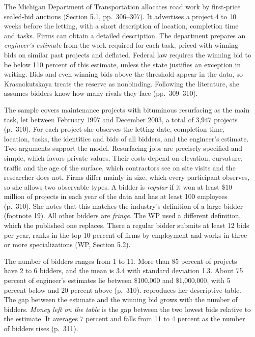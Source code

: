 The Michigan Department of Transportation allocates road work by first-price sealed-bid auctions
(Section 5.1, pp.~306--307). It advertises a project 4 to 10 weeks before the letting, with a short
description of location, completion time and tasks. Firms can obtain a detailed description. The
department prepares an \emph{engineer's estimate} from the work required for each task, priced with
winning bids on similar past projects and deflated. Federal law requires the winning bid to be below
110 percent of this estimate, unless the state justifies an exception in writing. Bids and even
winning bids above the threshold appear in the data, so Krasnokutskaya treats the reserve as
nonbinding. Following the literature, she assumes bidders know how many rivals they face
(pp.~309--310).

The sample covers maintenance projects with bituminous resurfacing as the main task, let between
February 1997 and December 2003, a total of 3,947 projects (p.~310). For each project she observes the
letting date, completion time, location, tasks, the identities and bids of all bidders, and the
engineer's estimate. Two arguments support the model. Resurfacing jobs are precisely specified and
simple, which favors private values. Their costs depend on elevation, curvature, traffic and the age
of the surface, which contractors see on site visits and the researcher does not. Firms differ mainly
in size, which every participant observes, so she allows two observable types. A bidder is
\emph{regular} if it won at least \$10 million of projects in each year of the data and has at least
100 employees (p.~310). She notes that this matches the industry's definition of a large bidder
(footnote 19). All other bidders are \emph{fringe}. The WP used a different definition, which the
published one replaces. There a regular bidder submits at least 12 bids per year, ranks in the top 10
percent of firms by employment and works in three or more specializations (WP, Section 5.2).

The number of bidders ranges from 1 to 11. More than 85 percent of projects have 2 to 6 bidders, and
the mean is 3.4 with standard deviation 1.3. About 75 percent of engineer's estimates lie between
\$100,000 and \$1,000,000, with 5 percent below and 20 percent above (p.~310).
 reproduces her descriptive table. The gap between the estimate and the
winning bid grows with the number of bidders. \emph{Money left on the table} is the gap between the two
lowest bids relative to the estimate. It averages 7 percent and falls from 11 to 4 percent as the
number of bidders rises (p.~311).


